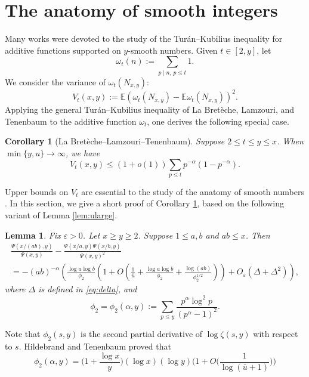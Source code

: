 \documentclass{amsart}
\theoremstyle{plain}
\newtheorem{lem}[thm]{Lemma}
\newtheorem{cor}[thm]{Corollary}
\theoremstyle{remark}
\newcommand{\EE}{\mathbb{E}}
\newcommand{\ubar}{\bar{u}}
\newcommand{\additive}{\Delta}
\begin{document}
\section{The anatomy of smooth integers}
Many works \cite{AlladiTuran,Xuan1,Xuan2,DLBT2005,DLB2,DLB3,DLB4,DLB2016,DLB6} were devoted to the study of the Tur{\'a}n--Kubilius inequality for additive functions supported on $y$-smooth numbers. Given $t \in [2,y]$, let \[\omega_t(n):=\sum_{p \mid n, \, p \le t}1.\]
We consider the variance of $\omega_t(N_{x,y})$: \[V_t(x,y):=\EE (\omega_t(N_{x,y})-\EE\omega_t(N_{x,y}))^2.\]
Applying the general Tur{\'a}n--Kubilius inequality of La Bret\`eche, Lamzouri, and Tenenbaum \cite[Thm.~1.1]{DLB6} to the additive function $\omega_t$, one derives the following special case.
\begin{cor}[La Bret\`eche--Lamzouri--Tenenbaum]\label{cor:special}
	Suppose $2 \le t \le y \le x$. When $\min\{y,u\} \to \infty$, we have \[V_t(x,y) \le (1+o(1)) \sum_{p\le t}p^{-\alpha}(1-p^{-\alpha}).\] 
\end{cor}
Upper bounds on $V_t$ are essential to the study of the anatomy of smooth numbers \cite{DLBT2005,DLB2016}. In this section, we give a short proof of Corollary \ref{cor:special}, based on the following variant of Lemma \ref{lem:ularge}.
\begin{lem}\label{lem:psipsi}	Fix $\varepsilon>0$.	Let $x \ge y \ge 2$. Suppose $1 \le a,b$ and $ab \le x$. Then
	\begin{multline*} \frac{\Psi(x/(ab),y)}{\Psi(x,y)} -\frac{\Psi(x/a,y)\Psi(x/b,y)}{\Psi(x,y)^2} \\= -(ab)^{-\alpha}\left( \frac{\log a \log b}{\phi_2}\left(1 + O\left(\frac{1}{\ubar}+\frac{\log a \log b}{\phi_2}+ \frac{\log(ab)}{\phi_2^{1/2}}\right)\right) + O_{\varepsilon}(\additive + \additive^2)\right),
	\end{multline*}
	where $\additive$ is defined in \eqref{eq:delta}, and 
	\begin{equation}
		\label{eq:phi_2}
		\phi_2=\phi_2(\alpha,y):=\sum_{p \le y}\frac{p^{\alpha}\log^2 p}{(p^{\alpha}-1)^2}.
	\end{equation}
\end{lem}
Note that $\phi_2(s,y)$ is the second partial derivative of $\log \zeta(s,y)$ with respect to $s$. Hildebrand and Tenenbaum \cite[Thm.~2]{HildebrandTenenbaum1986}  proved that 
\begin{equation}\label{eq:phi_2_est}
\phi_2(\alpha,y)=\bigg(1+\frac{\log x}{y}\bigg)(\log x)(\log y ) \bigg(1+O\bigg(\frac{1}{\log(\ubar+1)}\bigg)\bigg)
\end{equation}
\end{document}
